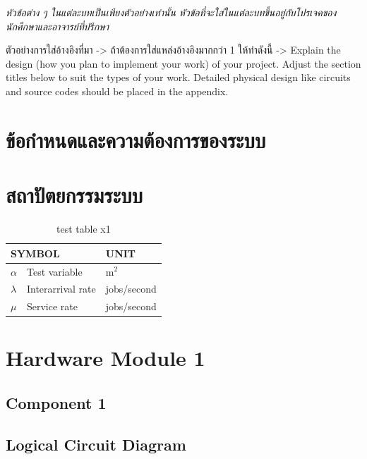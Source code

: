 \documentclass[12pt,oneside,openright,a4paper]{cpe-thai-project}
\begin{document}
\emph{หัวข้อต่าง ๆ ในแต่ละบทเป็นเพียงตัวอย่างเท่านั้น หัวข้อที่จะใส่ในแต่ละบทขึ้นอยู่กับโปรเจคของนักศึกษาและอาจารย์ที่ปรึกษา}


ตัวอย่างการใส่อ้างอิงที่มา -> \cite{hypersense} ถ้าต้องการใส่แหล่งอ้างอิงมากกว่า 1 ให้ทำดังนี้ -> \cite{hypersense,bworld} 
Explain the design (how you plan to implement your work) of your project. Adjust the section titles below to suit the types of your work. Detailed physical design like circuits and source codes should be placed in the appendix.

\section{ข้อกำหนดและความต้องการของระบบ}

\section{สถาปัตยกรรมระบบ}

\begin{table}[!h]
\centering
\caption{test table x1}\label{tbl:symbols}
\begin{tabular}{@{}p{}|p{}p{}}\hline
\multicolumn{2}{l}{\textbf{SYMBOL}}  & \textbf{UNIT} \\ \hline 
$\alpha$ & Test variable\hfill & m$^2$ \\
$\lambda$ & Interarrival rate\hfill &  jobs/second\\
$\mu$ & Service rate\hfill & jobs/second \\ \hline
\end{tabular}
\end{table}



\section{Hardware Module 1}
\subsection{Component 1}
\subsection{Logical Circuit Diagram}
\end{document}
